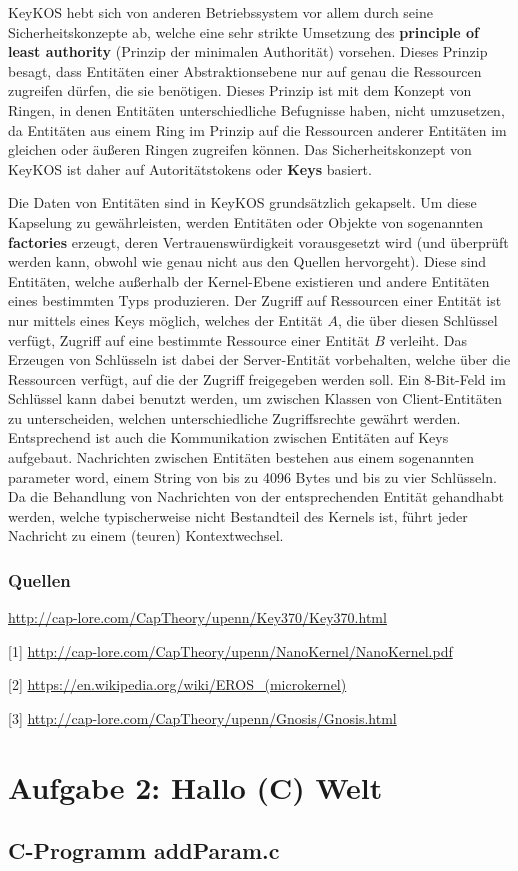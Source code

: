 \documentclass[numbers=noendperiod]{scrartcl}
\begin{document}
KeyKOS hebt sich von anderen Betriebssystem vor allem durch seine Sicherheitskonzepte ab, welche eine sehr strikte Umsetzung des \textbf{principle of least authority} (Prinzip der minimalen Authorität) vorsehen. Dieses Prinzip besagt, dass Entitäten einer Abstraktionsebene nur auf genau die Ressourcen zugreifen dürfen, die sie benötigen. Dieses Prinzip ist mit dem Konzept von Ringen, in denen Entitäten unterschiedliche Befugnisse haben, nicht umzusetzen, da Entitäten aus einem Ring im Prinzip auf die Ressourcen anderer Entitäten im gleichen oder äußeren Ringen zugreifen können. Das Sicherheitskonzept von KeyKOS ist daher auf Autoritätstokens oder \textbf{Keys} basiert.

Die Daten von Entitäten sind in KeyKOS grundsätzlich gekapselt. Um diese Kapselung zu gewährleisten, werden Entitäten oder Objekte von sogenannten \textbf{factories} erzeugt, deren Vertrauenswürdigkeit vorausgesetzt wird (und überprüft werden kann, obwohl wie genau nicht aus den Quellen hervorgeht). Diese sind Entitäten, welche außerhalb der Kernel-Ebene existieren und andere Entitäten eines bestimmten Typs produzieren. Der Zugriff auf Ressourcen einer Entität ist nur mittels eines Keys möglich, welches der Entität $A$, die über diesen Schlüssel verfügt, Zugriff auf eine bestimmte Ressource einer Entität $B$ verleiht. Das Erzeugen von Schlüsseln ist dabei der Server-Entität vorbehalten, welche über die Ressourcen verfügt, auf die der Zugriff freigegeben werden soll. Ein 8-Bit-Feld im Schlüssel kann dabei benutzt werden, um zwischen Klassen von Client-Entitäten zu unterscheiden, welchen unterschiedliche Zugriffsrechte gewährt werden.\\

Entsprechend ist auch die Kommunikation zwischen Entitäten auf Keys aufgebaut. Nachrichten zwischen Entitäten bestehen aus einem sogenannten parameter word, einem String von bis zu 4096 Bytes und bis zu vier Schlüsseln.
Da die Behandlung von Nachrichten von der entsprechenden Entität gehandhabt werden, welche typischerweise nicht Bestandteil des Kernels ist, führt jeder Nachricht zu einem (teuren) Kontextwechsel.

\subsubsection*{Quellen}

\url{http://cap-lore.com/CapTheory/upenn/Key370/Key370.html}

[1] \url{http://cap-lore.com/CapTheory/upenn/NanoKernel/NanoKernel.pdf}

[2] \url{https://en.wikipedia.org/wiki/EROS_(microkernel)}

[3] \url{http://cap-lore.com/CapTheory/upenn/Gnosis/Gnosis.html}

\section*{Aufgabe 2: Hallo (C) Welt}

\subsection*{C-Programm addParam.c}

\end{document}
